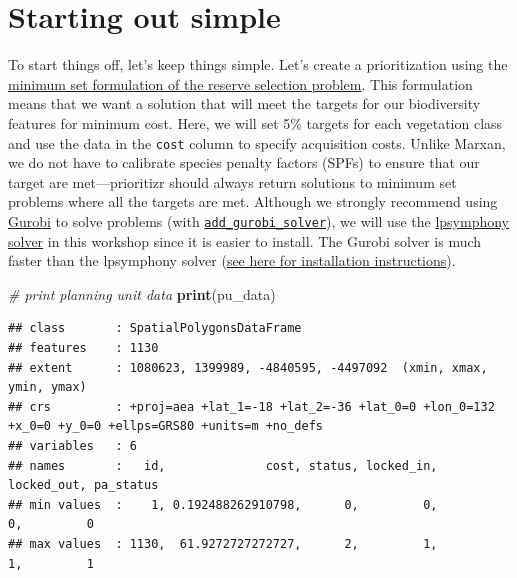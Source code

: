 \documentclass[12pt,]{book}
\newenvironment{Shaded}{\begin{snugshade}}{\end{snugshade}}
\newcommand{\KeywordTok}[1]{\textcolor[rgb]{0.13,0.29,0.53}{\textbf{#1}}}
\newcommand{\CommentTok}[1]{\textcolor[rgb]{0.56,0.35,0.01}{\textit{#1}}}
\newcommand{\NormalTok}[1]{#1}
\begin{document}
\section{Starting out simple}\label{starting-out-simple}

To start things off, let's keep things simple. Let's create a
prioritization using the
\href{https://prioritizr.net/reference/add_min_set_objective.html}{minimum
set formulation of the reserve selection problem}. This formulation
means that we want a solution that will meet the targets for our
biodiversity features for minimum cost. Here, we will set 5\% targets
for each vegetation class and use the data in the \texttt{cost} column
to specify acquisition costs. Unlike Marxan, we do not have to calibrate
species penalty factors (SPFs) to ensure that our target are
met---prioritizr should always return solutions to minimum set problems
where all the targets are met. Although we strongly recommend using
\href{https://www.gurobi.com/}{Gurobi} to solve problems (with
\href{https://prioritizr.net/reference/add_gurobi_solver.html}{\texttt{add\_gurobi\_solver}}),
we will use the
\href{https://prioritizr.net/reference/add_lsymphony_solver.html}{lpsymphony
solver} in this workshop since it is easier to install. The Gurobi
solver is much faster than the lpsymphony solver
(\href{https://prioritizr.net/articles/gurobi_installation.html}{see
here for installation instructions}).

\begin{Shaded}
\begin{Highlighting}[]
\CommentTok{# print planning unit data}
\KeywordTok{print}\NormalTok{(pu_data)}
\end{Highlighting}
\end{Shaded}

\begin{verbatim}
## class       : SpatialPolygonsDataFrame 
## features    : 1130 
## extent      : 1080623, 1399989, -4840595, -4497092  (xmin, xmax, ymin, ymax)
## crs         : +proj=aea +lat_1=-18 +lat_2=-36 +lat_0=0 +lon_0=132 +x_0=0 +y_0=0 +ellps=GRS80 +units=m +no_defs 
## variables   : 6
## names       :   id,              cost, status, locked_in, locked_out, pa_status 
## min values  :    1, 0.192488262910798,      0,         0,          0,         0 
## max values  : 1130,  61.9272727272727,      2,         1,          1,         1
\end{verbatim}
\end{document}
